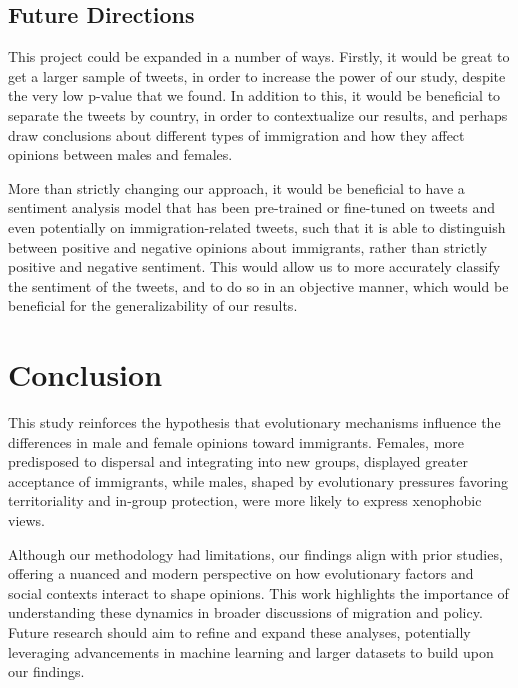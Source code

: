 \documentclass{article}
\begin{document}
\subsection{Future Directions}

This project could be expanded in a number of ways. Firstly, it would be great to get a larger sample of tweets, in order to increase the power of our study, despite the very low p-value that we found. In addition to this, it would be beneficial to separate the tweets by country, in order to contextualize our results, and perhaps draw conclusions about different types of immigration and how they affect opinions between males and females.

More than strictly changing our approach, it would be beneficial to have a sentiment analysis model that has been pre-trained or fine-tuned on tweets and even potentially on immigration-related tweets, such that it is able to distinguish between positive and negative opinions about immigrants, rather than strictly positive and negative sentiment. This would allow us to more accurately classify the sentiment of the tweets, and to do so in an objective manner, which would be beneficial for the generalizability of our results.

\section{Conclusion}

This study reinforces the hypothesis that evolutionary mechanisms influence the differences in male and female opinions toward immigrants. Females, more predisposed to dispersal and integrating into new groups, displayed greater acceptance of immigrants, while males, shaped by evolutionary pressures favoring territoriality and in-group protection, were more likely to express xenophobic views.

Although our methodology had limitations, our findings align with prior studies, offering a nuanced and modern perspective on how evolutionary factors and social contexts interact to shape opinions. This work highlights the importance of understanding these dynamics in broader discussions of migration and policy. Future research should aim to refine and expand these analyses, potentially leveraging advancements in machine learning and larger datasets to build upon our findings.
\end{document}
